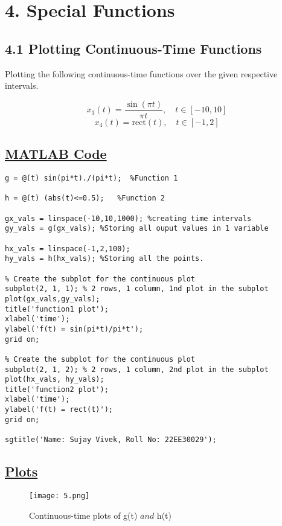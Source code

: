 \documentclass[a4paper,12pt,fleqn]{article}
\begin{document}
\FloatBarrier
\newpage

\section*{4. Special Functions}
\subsection*{4.1 Plotting Continuous-Time Functions}
Plotting the following continuous-time functions over the given respective intervals.

\begin{equation*}
x_3(t) = \frac{\sin(\pi t)}{\pi t}, \quad t \in [-10, 10]
\end{equation*}
\begin{equation*}
x_4(t) = \text{rect}(t), \quad t \in [-1, 2]
\end{equation*}
 \subsection*{\underline{MATLAB Code}}
 \begin{lstlisting}
g = @(t) sin(pi*t)./(pi*t);  %Function 1

h = @(t) (abs(t)<=0.5);   %Function 2

gx_vals = linspace(-10,10,1000); %creating time intervals
gy_vals = g(gx_vals); %Storing all ouput values in 1 variable

hx_vals = linspace(-1,2,100);
hy_vals = h(hx_vals); %Storing all the points.

% Create the subplot for the continuous plot
subplot(2, 1, 1); % 2 rows, 1 column, 1nd plot in the subplot
plot(gx_vals,gy_vals);
title('function1 plot');
xlabel('time');
ylabel('f(t) = sin(pi*t)/pi*t');
grid on;

% Create the subplot for the continuous plot
subplot(2, 1, 2); % 2 rows, 1 column, 2nd plot in the subplot
plot(hx_vals, hy_vals);
title('function2 plot');
xlabel('time');
ylabel('f(t) = rect(t)');
grid on;

sgtitle('Name: Sujay Vivek, Roll No: 22EE30029');
 \end{lstlisting}
\subsection*{\underline{Plots}}
\begin{figure}[h]
    \centering
    \texttt{[image: 5.png]}
    \caption{Continuous-time plots of g(t) $ and $ h(t)}
    \label{fig:enter-label}
\end{figure}
\newpage
\end{document}

